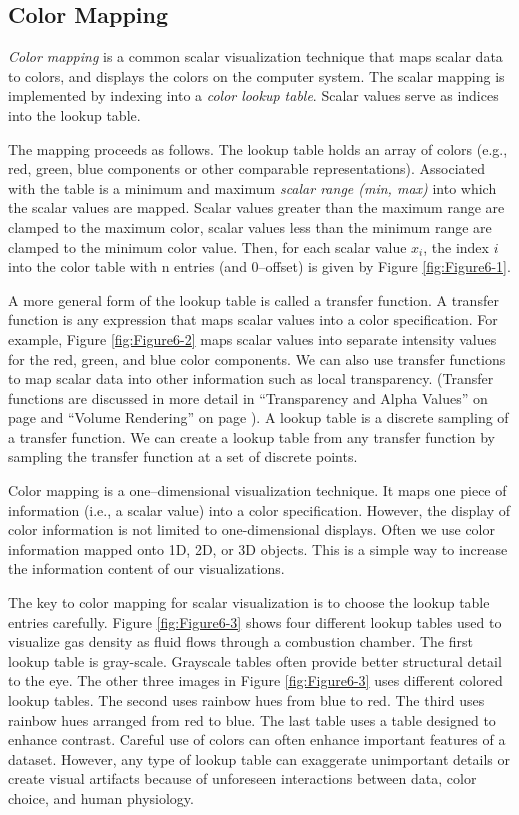 \subsection{Color Mapping}
\label{subsec:color_mapping}

\emph{Color mapping} is a common scalar visualization technique that maps scalar data to colors, and displays the colors on the computer system. The scalar mapping is implemented by indexing into a \emph{color lookup table}. Scalar values serve as indices into the lookup table.

The mapping proceeds as follows. The lookup table holds an array of colors (e.g., red, green, blue components or other comparable representations). Associated with the table is a minimum and maximum \emph{scalar range (min, max)} into which the scalar values are mapped. Scalar values greater than the maximum range are clamped to the maximum color, scalar values less than the minimum range are clamped to the minimum color value. Then, for each scalar value $x_i$, the index $i$ into the color table with n entries (and 0--offset) is given by Figure \ref{fig:Figure6-1}.

A more general form of the lookup table is called a transfer function. A transfer function is any expression that maps scalar values into a color specification. For example, Figure \ref{fig:Figure6-2} maps scalar values into separate intensity values for the red, green, and blue color components. We can also use transfer functions to map scalar data into other information such as local transparency. (Transfer functions are discussed in more detail in ``Transparency and Alpha Values'' on page \pageref{sec:transparency_alpha} and ``Volume Rendering'' on page \pageref{sec:volume_rendering}).
A lookup table is a discrete sampling of a transfer function.
We can create a lookup table from any transfer function by sampling the transfer function at a set of discrete points.

Color mapping is a one--dimensional visualization technique. It maps one piece of information (i.e., a scalar value) into a color specification. However, the display of color information is not limited to one-dimensional displays. Often we use color information mapped onto 1D, 2D, or 3D objects. This is a simple way to increase the information content of our visualizations.

The key to color mapping for scalar visualization is to choose the lookup table entries carefully. Figure \ref{fig:Figure6-3} shows four different lookup tables used to visualize gas density as fluid flows through a combustion chamber. The first lookup table is gray-scale. Grayscale tables often provide better structural detail to the eye. The other three images in Figure \ref{fig:Figure6-3} uses different colored lookup tables. The second uses rainbow hues from blue to red. The third uses rainbow hues arranged from red to blue. The last table uses a table designed to enhance contrast. Careful use of colors can often enhance important features of a dataset. However, any type of lookup table can exaggerate unimportant details or create visual artifacts because of unforeseen interactions between data, color choice, and human physiology.

